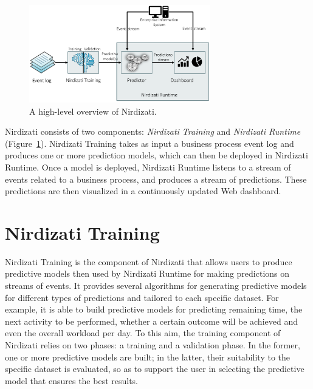 \documentclass[runningheads,a4paper]{llncs}
\begin{document}
\begin{figure}[t]%
	\centering
	\includegraphics[width=0.7\textwidth]{img/nirdizati-overall}
	\caption{A high-level overview of Nirdizati.}
	\label{fig:nirdizati-overall}
\end{figure}


Nirdizati consists of two components: \textit{Nirdizati Training} and \textit{Nirdizati Runtime} (Figure~\ref{fig:nirdizati-overall}). Nirdizati Training takes as input a business process event log and produces one or more prediction models, which can then be deployed in Nirdizati Runtime. Once a model is deployed, Nirdizati Runtime listens to a stream of events related to a business process, and produces a stream of predictions. These predictions are then visualized in a continuously updated Web dashboard.

\section{Nirdizati Training} \label{sec:training}
Nirdizati Training is the component of Nirdizati that allows users to produce predictive models then used by
Nirdizati Runtime for making predictions on streams of events. It provides several algorithms for generating
predictive models for different types of predictions and tailored to each specific dataset.
For example, it is able to build predictive models for predicting remaining time, the next activity to be
performed, whether a certain outcome will be achieved and even the overall workload per day.
%
To this aim, the training component of Nirdizati relies on two phases: a training and a validation phase.
In the former, one or more predictive models are built; in the latter, their suitability to the specific
dataset is evaluated, so as to support the user in selecting the predictive model that ensures the best results.
\end{document}
